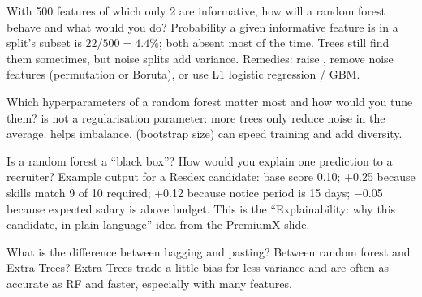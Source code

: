\begin{qa}{\deep With 500 features of which only 2 are informative, how will a random forest behave and what would you do?}
\why Probability a given informative feature is in a split's subset is $22/500 = 4.4\%$; both absent most of the time. Trees still
find them sometimes, but noise splits add variance. Remedies: raise , remove noise features (permutation or
Boruta), or use L1 logistic regression / GBM.
\end{qa}

\begin{qa}{Which hyperparameters of a random forest matter most and how would you tune them?}
\why {} is not a regularisation parameter: more trees only reduce noise in the average.  helps imbalance.  (bootstrap size) can speed training and add diversity.
\end{qa}

\begin{qa}{\deep Is a random forest a ``black box''? How would you explain one prediction to a recruiter?}
\why Example output for a Resdex candidate: base score 0.10; +0.25 because skills match 9 of 10 required; +0.12 because notice period
is 15 days; $-$0.05 because expected salary is above budget. This is the ``Explainability: why this candidate, in plain language''
idea from the PremiumX slide.
\end{qa}

\begin{qa}{What is the difference between bagging and pasting? Between random forest and Extra Trees?}
\why Extra Trees trade a little bias for less variance and are often as accurate as RF and faster, especially with many features.
\end{qa}
